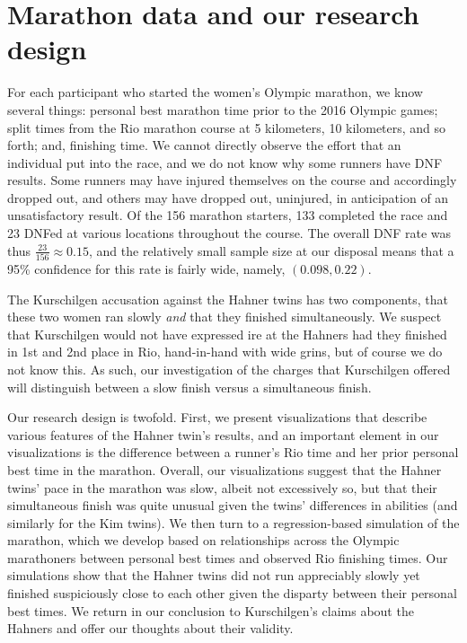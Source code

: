 \documentclass[12pt,titlepage]{article}
\begin{document}
\section*{Marathon data and our research design}

For each participant who started the women's Olympic marathon, we know
several things: personal best marathon time prior to the 2016 Olympic
games; split times from the Rio marathon course at 5 kilometers, 10
kilometers, and so forth; and, finishing time. We cannot directly
observe the effort that an individual put into the race, and we do not
know why some runners have DNF results.  Some runners may have injured
themselves on the course and accordingly dropped out, and others may
have dropped out, uninjured, in anticipation of an unsatisfactory
result. Of the 156 marathon starters, 133 completed the race and 23
DNFed at various locations throughout the course. The overall DNF rate
was thus $\frac{23}{156} \approx 0.15$, and the relatively small
sample size at our disposal means that a 95\% confidence for this rate
is fairly wide, namely, $\left(0.098, 0.22\right)$. 

The Kurschilgen accusation against the Hahner twins has two
components, that these two women ran slowly \emph{and} that they
finished simultaneously.  We suspect that Kurschilgen would not have
expressed ire at the Hahners had they finished in 1st and 2nd place in
Rio, hand-in-hand with wide grins, but of course we do not know this.
As such, our investigation of the charges that Kurschilgen offered
will distinguish between a slow finish versus a simultaneous finish.

Our research design is twofold.  First, we present visualizations that
describe various features of the Hahner twin's results, and an
important element in our visualizations is the difference between a
runner's Rio time and her prior personal best time in the marathon.
Overall, our visualizations suggest that the Hahner twins' pace in the
marathon was slow, albeit not excessively so, but that their
simultaneous finish was quite unusual given the twins' differences in
abilities (and similarly for the Kim twins).  We then turn to a
regression-based simulation of the marathon, which we develop based on
relationships across the Olympic marathoners between personal best
times and observed Rio finishing times.  Our simulations show that the
Hahner twins did not run appreciably slowly yet finished suspiciously
close to each other given the disparty between their personal best
times.  We return in our conclusion to Kurschilgen's claims about the
Hahners and offer our thoughts about their validity.
\end{document}
